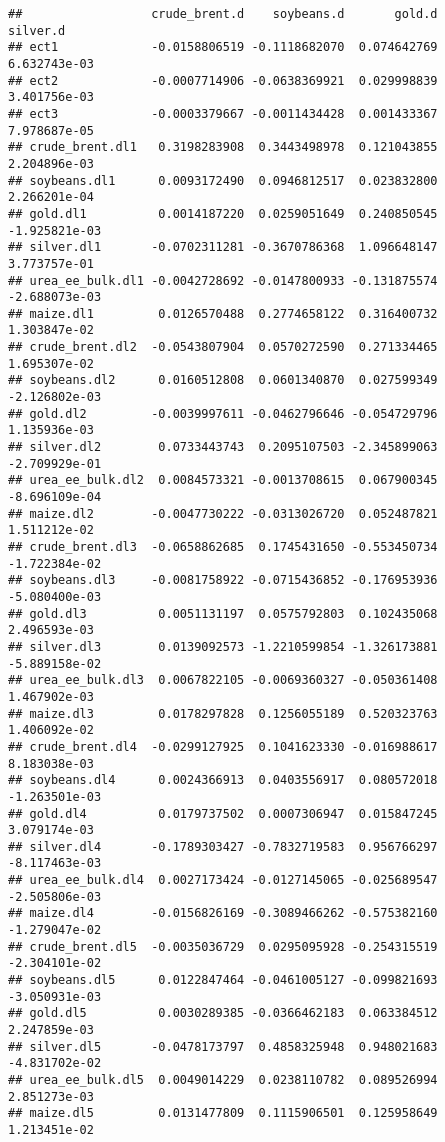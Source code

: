 \documentclass[
]{article}
\begin{document}
\begin{verbatim}
##                  crude_brent.d    soybeans.d       gold.d      silver.d
## ect1             -0.0158806519 -0.1118682070  0.074642769  6.632743e-03
## ect2             -0.0007714906 -0.0638369921  0.029998839  3.401756e-03
## ect3             -0.0003379667 -0.0011434428  0.001433367  7.978687e-05
## crude_brent.dl1   0.3198283908  0.3443498978  0.121043855  2.204896e-03
## soybeans.dl1      0.0093172490  0.0946812517  0.023832800  2.266201e-04
## gold.dl1          0.0014187220  0.0259051649  0.240850545 -1.925821e-03
## silver.dl1       -0.0702311281 -0.3670786368  1.096648147  3.773757e-01
## urea_ee_bulk.dl1 -0.0042728692 -0.0147800933 -0.131875574 -2.688073e-03
## maize.dl1         0.0126570488  0.2774658122  0.316400732  1.303847e-02
## crude_brent.dl2  -0.0543807904  0.0570272590  0.271334465  1.695307e-02
## soybeans.dl2      0.0160512808  0.0601340870  0.027599349 -2.126802e-03
## gold.dl2         -0.0039997611 -0.0462796646 -0.054729796  1.135936e-03
## silver.dl2        0.0733443743  0.2095107503 -2.345899063 -2.709929e-01
## urea_ee_bulk.dl2  0.0084573321 -0.0013708615  0.067900345 -8.696109e-04
## maize.dl2        -0.0047730222 -0.0313026720  0.052487821  1.511212e-02
## crude_brent.dl3  -0.0658862685  0.1745431650 -0.553450734 -1.722384e-02
## soybeans.dl3     -0.0081758922 -0.0715436852 -0.176953936 -5.080400e-03
## gold.dl3          0.0051131197  0.0575792803  0.102435068  2.496593e-03
## silver.dl3        0.0139092573 -1.2210599854 -1.326173881 -5.889158e-02
## urea_ee_bulk.dl3  0.0067822105 -0.0069360327 -0.050361408  1.467902e-03
## maize.dl3         0.0178297828  0.1256055189  0.520323763  1.406092e-02
## crude_brent.dl4  -0.0299127925  0.1041623330 -0.016988617  8.183038e-03
## soybeans.dl4      0.0024366913  0.0403556917  0.080572018 -1.263501e-03
## gold.dl4          0.0179737502  0.0007306947  0.015847245  3.079174e-03
## silver.dl4       -0.1789303427 -0.7832719583  0.956766297 -8.117463e-03
## urea_ee_bulk.dl4  0.0027173424 -0.0127145065 -0.025689547 -2.505806e-03
## maize.dl4        -0.0156826169 -0.3089466262 -0.575382160 -1.279047e-02
## crude_brent.dl5  -0.0035036729  0.0295095928 -0.254315519 -2.304101e-02
## soybeans.dl5      0.0122847464 -0.0461005127 -0.099821693 -3.050931e-03
## gold.dl5          0.0030289385 -0.0366462183  0.063384512  2.247859e-03
## silver.dl5       -0.0478173797  0.4858325948  0.948021683 -4.831702e-02
## urea_ee_bulk.dl5  0.0049014229  0.0238110782  0.089526994  2.851273e-03
## maize.dl5         0.0131477809  0.1115906501  0.125958649  1.213451e-02

\end{verbatim}
\end{document}
